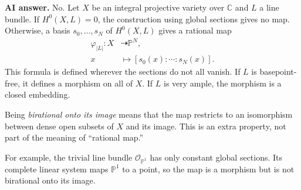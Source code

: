 \medskip\noindent
\textbf{AI answer.}
No. Let $X$ be an integral projective
variety over $\mathbb{C}$ and $L$ a line
bundle. If $H^0(X,L)=0$, the construction
using global sections gives no map.
Otherwise, a basis $s_0,\ldots,s_N$ of
$H^0(X,L)$ gives a rational map
$$
\begin{aligned}
\varphi_{|L|}:X
&\dashrightarrow\mathbb{P}^N,\\
x&\longmapsto[s_0(x):\cdots:s_N(x)].
\end{aligned}
$$
This formula is defined wherever the
sections do not all vanish. If $L$ is
basepoint-free, it defines a morphism on
all of $X$. If $L$ is very ample, the
morphism is a closed embedding.

Being \textit{birational onto its image}
means that the map restricts to an
isomorphism between dense open subsets
of $X$ and its image. This is an extra
property, not part of the meaning of
``rational map.''

For example, the trivial line bundle
$\mathcal{O}_{\mathbb{P}^1}$ has only
constant global sections. Its complete
linear system maps $\mathbb{P}^1$ to a
point, so the map is a morphism but is
not birational onto its image.






